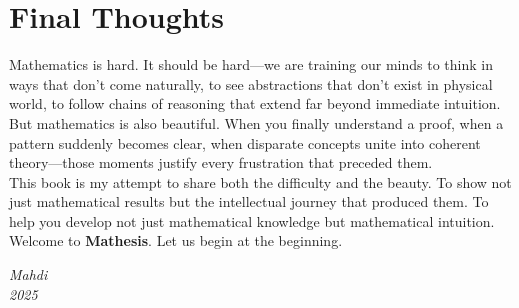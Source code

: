 \section*{Final Thoughts}

Mathematics is hard. It should be hard—we are training our minds to think in ways that don't come naturally, to see abstractions that don't exist in physical world, to follow chains of reasoning that extend far beyond immediate intuition.\\
But mathematics is also beautiful. When you finally understand a proof, when a pattern suddenly becomes clear, when disparate concepts unite into coherent theory—those moments justify every frustration that preceded them.\\
This book is my attempt to share both the difficulty and the beauty. To show not just mathematical results but the intellectual journey that produced them. To help you develop not just mathematical knowledge but mathematical intuition.\\

Welcome to \textbf{Mathesis}. Let us begin at the beginning.

\vfill{}

\begin{flushright}
    \textit{Mahdi} \\
    \textit{2025} \\
\end{flushright}

\clearpage
